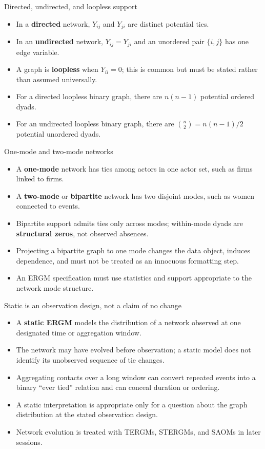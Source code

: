 \documentclass[aspectratio=169,11pt]{beamer}
\newcommand{\term}[1]{\textbf{\color{nupurple}#1}}
\begin{document}
\begin{frame}{Directed, undirected, and loopless support}
\begin{itemize}
\item In a \term{directed} network, $Y_{ij}$ and $Y_{ji}$ are distinct potential ties.
\item In an \term{undirected} network, $Y_{ij}=Y_{ji}$ and an unordered pair $\{i,j\}$ has one edge variable.
\item A graph is \term{loopless} when $Y_{ii}=0$; this is common but must be stated rather than assumed universally.
\item For a directed loopless binary graph, there are $n(n-1)$ potential ordered dyads.
\item For an undirected loopless binary graph, there are $\binom{n}{2}=n(n-1)/2$ potential unordered dyads.
\end{itemize}
\end{frame}

\begin{frame}{One-mode and two-mode networks}
\begin{itemize}
\item A \term{one-mode} network has ties among actors in one actor set, such as firms linked to firms.
\item A \term{two-mode} or \term{bipartite} network has two disjoint modes, such as women connected to events.
\item Bipartite support admits ties only across modes; within-mode dyads are \term{structural zeros}, not observed absences.
\item Projecting a bipartite graph to one mode changes the data object, induces dependence, and must not be treated as an innocuous formatting step.
\item An ERGM specification must use statistics and support appropriate to the network mode structure.
\end{itemize}
\end{frame}

\begin{frame}{Static is an observation design, not a claim of no change}
\begin{itemize}
\item A \term{static ERGM} models the distribution of a network observed at one designated time or aggregation window.
\item The network may have evolved before observation; a static model does not identify its unobserved sequence of tie changes.
\item Aggregating contacts over a long window can convert repeated events into a binary ``ever tied'' relation and can conceal duration or ordering.
\item A static interpretation is appropriate only for a question about the graph distribution at the stated observation design.
\item Network evolution is treated with TERGMs, STERGMs, and SAOMs in later sessions.
\end{itemize}
\end{frame}
\end{document}
